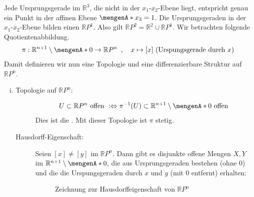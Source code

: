 Jede Ursprungsgerade im $\mathds{R}^3$, die nicht in der $x_1$-$x_2$-Ebene liegt, entspricht genau ein Punkt in der affinen Ebene $\set{x_3=1} $. Die Ursprungsgeraden in
der $x_1$-$x_2$-Ebene bilden einen $\mathds{R}P^1$. Also gilt
\(
	\mathds{R}P^2 = \mathds{R}^2 \cup \mathds{R}P^1.
\)
Wir betrachten folgende Quotientenabbildung.
\[
	\pi : \mathds{R}^{n+1} \setminus \set{0} \to \mathds{R}P^n \enspace, \quad x \mapsto [x] \text{ (Urspungsgerade durch $x$)} 
\]
Damit definieren wir nun eine Topologie und eine differenzierbare Struktur auf $\mathds{R} P^n$.
\begin{enumerate}[(i)]
	\item \begin{description}
		\item[Topologie auf $\mathds{R}P^n$:]  
		\[
			U \subset \mathds{R}P^n \text{ offen } :\Leftrightarrow \pi ^{-1} (U) \subset \mathds{R}^{n+1} \setminus \set{0} \text{ offen}
		\]
		Dies ist die . Mit dieser Topologie ist $\pi $ stetig. 
		\item[Hausdorff-Eigenschaft:] Seien $[x] \not= [y]$ im $\mathds{R}P^n$. Dann gibt es disjunkte offene Mengen $X,Y$ im $\mathds{R}^{n+1} \setminus \set{0} $, die aus 
		Ursprungsgeraden bestehen (ohne $0$) und die die Urspungsgeraden durch $x$ und $y$ (mit $0$ entfernt) erhalten: 
		\begin{figure}[H]
						\caption{Zeichnung zur Hausdorffeigenschaft von $\mathds{R}P^n$}
		\end{figure}
		

\end{description}
\end{enumerate}
